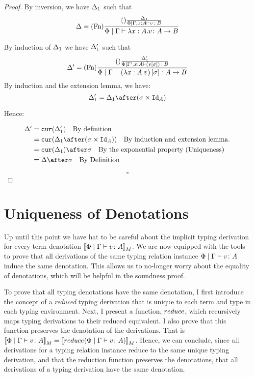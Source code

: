 \documentclass{Report}
\begin{document}
\begin{proof}

By inversion, we have $\Delta_1$ such that
\begin{equation}
    \Delta = (\text{Fn}) \frac{
        (\text{}) \frac{\Delta_1}{\Phi\mid\Gamma, x:A \vdash v \colon B}
    }{\Phi\mid\Gamma \vdash \lambda x : A. v \colon A\rightarrow B}
\end{equation}

By induction of $\Delta_1$ we have $\Delta_1'$ such that
\begin{equation}
    \Delta' = (\text{Fn}) \frac{
        (\text{}) \frac{\Delta_1'}{\Phi\mid\Gamma', x:A \vdash (v\left[\sigma\right]) \colon B}
    }{\Phi\mid\Gamma \vdash (\lambda x : A. v)\left[\sigma\right] \colon A\rightarrow B}
\end{equation}
By induction and the extension lemma, we have:
\begin{equation}
    \D_1' = \D_1\after(\si\times\Id{A})
\end{equation}

Hence:

\begin{align}
    \D' &= \cur{\D_1'}\qt{By definition}\\
        &= \cur{\D_1\after(\si\times\Id{A})}\qt{By induction and extension lemma.}\\
        & = \cur{\D_1}\after\si\qt{By the exponential property (Uniqueness)}\\
        &= \D\after\si\qt{By Definition}\\
\end{align}

$$\square$$
\end{proof}


\section{Uniqueness of Denotations}

Up until this point we have hat to be careful about the implicit typing derivation for every term denotation ${\bf [\![}\Phi\mid\Gamma \vdash v \colon A{\bf ]\!]}_M$. We are now equipped with the tools to prove that all derivations of the same typing relation instance $\Phi\mid\Gamma \vdash v \colon A$ induce the same denotation. This allows us to no-longer worry about the equality of denotations, which will be helpful in the soundness proof.

To prove that all typing denotations have the same denotation, I first introduce the concept of a \textit{reduced} typing derivation that is unique to each term and type in each typing environment. Next, I present a function, $reduce$, which recursively maps  typing derivations to their reduced equivalent. I also prove that this function preserves the denotation of the derivations. That is ${\bf [\![}\Phi\mid\Gamma \vdash v \colon A{\bf ]\!]}_M = {\bf [\![}reduce(\Phi\mid\Gamma \vdash v \colon A){\bf ]\!]}_M$. Hence, we can conclude, since all derivations for a typing relation instance reduce to the same unique typing derivation, and that the reduction function preserves the denotations, that all derivations of a typing derivation have the same denotation.
\end{document}
